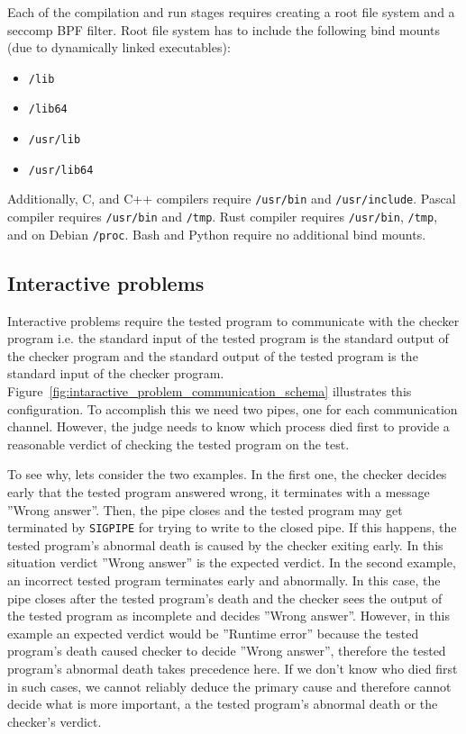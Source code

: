 \documentclass[en]{pracamgr}
\begin{document}
Each of the compilation and run stages requires creating a root file system and a seccomp BPF filter. Root file system has to include the following bind mounts (due to dynamically linked executables):
\begin{itemize}
    \item \texttt{/lib}
    \item \texttt{/lib64}
    \item \texttt{/usr/lib}
    \item \texttt{/usr/lib64}
\end{itemize}

Additionally, C, and C++ compilers require \texttt{/usr/bin} and \texttt{/usr/include}.
Pascal compiler requires \texttt{/usr/bin} and \texttt{/tmp}.
Rust compiler requires \texttt{/usr/bin}, \texttt{/tmp}, and on Debian \texttt{/proc}.
Bash and Python require no additional bind mounts.

\subsection{Interactive problems}

Interactive problems require the tested program to communicate with the checker program i.e. the standard input of the tested program is the standard output of the checker program and the standard output of the tested program is the standard input of the checker program. Figure~\ref{fig:intaractive_problem_communication_schema} illustrates this configuration. To accomplish this we need two pipes, one for each communication channel. However, the judge needs to know which process died first to provide a reasonable verdict of checking the tested program on the test.

To see why, lets consider the two examples. In the first one, the checker decides early that the tested program answered wrong, it terminates with a message ''Wrong answer''. Then, the pipe closes and the tested program may get terminated by \texttt{SIGPIPE} for trying to write to the closed pipe. If this happens, the tested program's abnormal death is caused by the checker exiting early. In this situation verdict ''Wrong answer'' is the expected verdict. In the second example, an incorrect tested program terminates early and abnormally. In this case, the pipe closes after the tested program's death and the checker sees the output of the tested program as incomplete and decides ''Wrong answer''. However, in this example an expected verdict would be ''Runtime error'' because the tested program's death caused checker to decide ''Wrong answer'', therefore the tested program's abnormal death takes precedence here. If we don't know who died first in such cases, we cannot reliably deduce the primary cause and therefore cannot decide what is more important, a the tested program's abnormal death or the checker's verdict.
\end{document}
